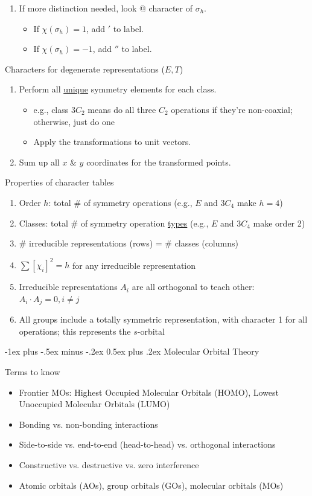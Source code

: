 \documentclass[10pt,landscape]{article}
\makeatletter
\renewcommand{\section}{\@startsection{section}{1}{0mm}%
                                {-1ex plus -.5ex minus -.2ex}%
                                {0.5ex plus .2ex}%
                                {\normalfont\large\bfseries}}
\makeatother
\begin{document}
\begin{multicols}{3}
\begin{enumerate}
	\item If more distinction needed, look @ character of $\sigma_h$.
	\begin{itemize}
		\item If $\chi(\sigma_h)=1$, add $'$ to label.
		\item If $\chi(\sigma_h)=-1$, add $''$ to label.
	\end{itemize}
\end{enumerate}

Characters for degenerate representations ($E, T$)
\begin{enumerate}
	\item Perform all \underline{unique} symmetry elements for each class.
	\begin{itemize}
		\item e.g., class $3C_2$ means do all three $C_2$ operations if they're non-coaxial; otherwise, just do one
		\item Apply the transformations to unit vectors.
	\end{itemize}
	\item Sum up all $x$ \& $y$ coordinates for the transformed points.
\end{enumerate}

Properties of character tables
\begin{enumerate}
	\item Order $h$: total \# of symmetry operations (e.g., $E$ and $3C_4$ make $h=4$)
	\item  Classes: total \# of symmetry operation \underline{types} (e.g., $E$ and $3C_4$ make order 2)
	\item \# irreducible representations (rows) = \# classes (columns)
	\item $\sum [\chi_i ]^2 = h$ for any irreducible representation
	\item Irreducible representations $A_i$ are all orthogonal to teach other: ${A_i} \cdot {A_j} = 0, i\neq j$ 
	\item All groups include a totally symmetric representation, with character 1 for all operations; this represents the $s$-orbital
\end{enumerate}

\hrulefill

\section{Molecular Orbital Theory}

Terms to know
\begin{itemize}
	\item Frontier MOs: Highest Occupied Molecular Orbitals (HOMO),  Lowest Unoccupied Molecular Orbitals (LUMO)
	\item Bonding vs. non-bonding interactions
	\item Side-to-side vs. end-to-end (head-to-head) vs. orthogonal interactions
	\item Constructive vs. destructive vs. zero interference
	\item Atomic orbitals (AOs), group orbitals (GOs), molecular orbitals (MOs)
\end{itemize}



\end{multicols}
\end{document}
